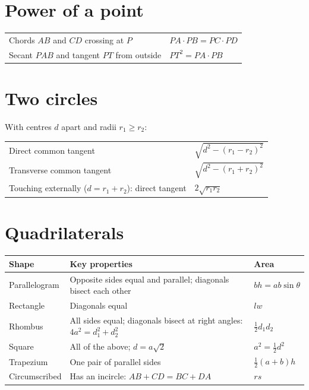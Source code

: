 \documentclass[11pt,a4paper,openany]{report}
\begin{document}
\section{Power of a point}
\begin{center}\small
\begin{tabular}{ll}
\toprule
Chords $AB$ and $CD$ crossing at $P$ & $PA\cdot PB=PC\cdot PD$\\
Secant $PAB$ and tangent $PT$ from outside & $PT^2=PA\cdot PB$\\
\bottomrule
\end{tabular}
\end{center}

\section{Two circles}
With centres $d$ apart and radii $r_1\ge r_2$:
\begin{center}\small
\begin{tabular}{ll}
\toprule
Direct common tangent & $\sqrt{d^2-(r_1-r_2)^2}$\\
Transverse common tangent & $\sqrt{d^2-(r_1+r_2)^2}$\\
Touching externally ($d=r_1+r_2$): direct tangent & $2\sqrt{r_1r_2}$\\
\bottomrule
\end{tabular}
\end{center}

\section{Quadrilaterals}
\begin{center}\small
\begin{tabular}{>{\raggedright}p{2.6cm}>{\raggedright}p{6.8cm}>{\raggedright\arraybackslash}p{4.4cm}}
\toprule
Shape & Key properties & Area\\\midrule
Parallelogram & Opposite sides equal and parallel; diagonals bisect each other & $bh=ab\sin\theta$\\
Rectangle & Diagonals equal & $lw$\\
Rhombus & All sides equal; diagonals bisect at right angles: $4a^2=d_1^2+d_2^2$ & $\frac12d_1d_2$\\
Square & All of the above; $d=a\sqrt2$ & $a^2=\frac12d^2$\\
Trapezium & One pair of parallel sides & $\frac12(a+b)h$\\
Circumscribed & Has an incircle: $AB+CD=BC+DA$ & $rs$\\
\bottomrule
\end{tabular}
\end{center}
\end{document}
